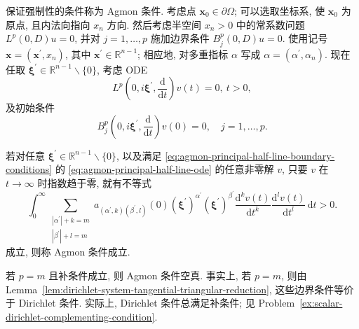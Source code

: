 保证强制性的条件称为 Agmon 条件. 考虑点 $\bm{x}_0\in\partial\Omega$; 可以选取坐标系, 使 $\bm{x}_0$ 为原点, 且内法向指向 $x_n$ 方向. 然后考虑半空间 $x_n>0$ 中的常系数问题 $L^p(0,D)u=0$, 并对 $j=1,\ldots,p$ 施加边界条件 $B_j^p(0,D)u=0$. 使用记号 $\bm{x}=(\bm{x}^{\prime},x_n)$, 其中 $\bm{x}^{\prime}\in\mathbb{R}^{n-1}$; 相应地, 对多重指标 $\alpha$ 写成 $\alpha=(\alpha^{\prime},\alpha_n)$. 现在任取 $\bm{\xi}^{\prime}\in\mathbb{R}^{n-1}\backslash\{0\}$, 考虑 ODE
\begin{equation}\label{eq:agmon-principal-half-line-ode}
L^p\left(0,i\bm{\xi}^{\prime},\frac{\mathrm{d}}{\mathrm{d}t}\right)v(t)=0,\ t>0,
\end{equation}
及初始条件
\begin{equation}\label{eq:agmon-principal-half-line-boundary-conditions}
B_j^p\left(0,i\bm{\xi}^{\prime},\frac{\mathrm{d}}{\mathrm{d}t}\right)v(0)=0,\quad j=1,\ldots,p.
\end{equation}


\begin{Definition}
\label{def:agmon-decaying-half-line-positivity}
若对任意 $\bm{\xi}^{\prime}\in\mathbb{R}^{n-1}\backslash\{0\}$, 以及满足 \eqref{eq:agmon-principal-half-line-boundary-conditions} 的 \eqref{eq:agmon-principal-half-line-ode} 的任意非零解 $v$, 只要 $v$ 在 $t\to\infty$ 时指数趋于零, 就有不等式
\begin{equation}\label{eq:agmon-decaying-principal-half-line-positivity}
\int_0^\infty\sum_{\substack{|\alpha^{\prime}|+k=m\\|\beta^{\prime}|+l=m}}a_{(\alpha^{\prime},k)(\beta^{\prime},l)}(0)(\bm{\xi}^{\prime})^{\alpha^{\prime}}(\bm{\xi}^{\prime})^{\beta^{\prime}}\frac{\mathrm{d}^kv(t)}{\mathrm{d}t^k}\frac{\mathrm{d}^lv(t)}{\mathrm{d}t^l}\,\mathrm{d}t>0.
\end{equation}
成立, 则称 Agmon 条件成立.
\end{Definition}

\begin{Remark}
\label{rem:agmon-dirichlet-vacuity}
若 $p=m$ 且补条件成立, 则 Agmon 条件空真. 事实上, 若 $p=m$, 则由 Lemma~\ref{lem:dirichlet-system-tangential-triangular-reduction}, 这些边界条件等价于 Dirichlet 条件. 实际上, Dirichlet 条件总满足补条件; 见 Problem~\ref{ex:scalar-dirichlet-complementing-condition}.
\end{Remark}
